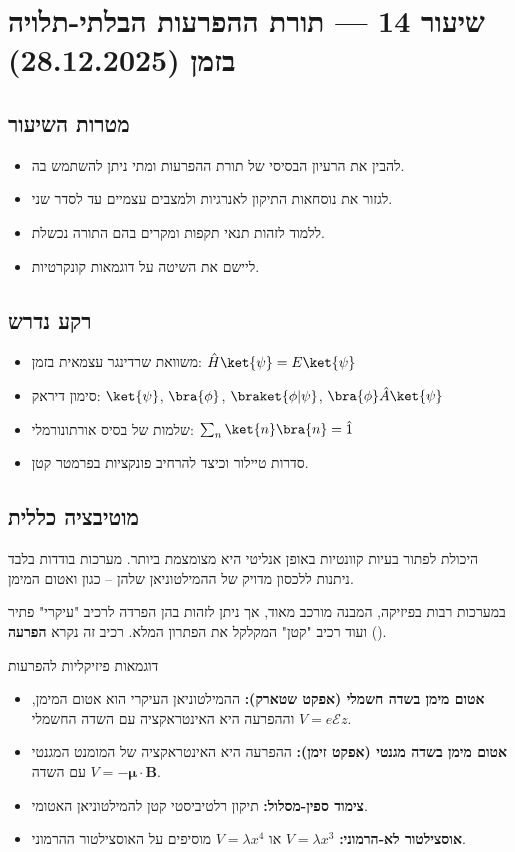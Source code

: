 \section{שיעור 14 — תורת ההפרעות הבלתי-תלויה בזמן (28.12.2025)}

\subsection*{מטרות השיעור}
\begin{itemize}
\item להבין את הרעיון הבסיסי של תורת ההפרעות ומתי ניתן להשתמש בה.
\item לגזור את נוסחאות התיקון לאנרגיות ולמצבים עצמיים עד לסדר שני.
\item ללמוד לזהות תנאי תקפות ומקרים בהם התורה נכשלת.
\item ליישם את השיטה על דוגמאות קונקרטיות.
\end{itemize}

\subsection*{רקע נדרש}
\begin{itemize}
\item משוואת שרדינגר עצמאית בזמן: $\hat{H}\ket{\psi} = E\ket{\psi}$
\item סימון דיראק: $\ket{\psi}$, $\bra{\phi}$, $\braket{\phi|\psi}$, $\bra{\phi}\hat{A}\ket{\psi}$
\item שלמות של בסיס אורתונורמלי: $\sum_n \ket{n}\bra{n} = \hat{1}$
\item סדרות טיילור וכיצד להרחיב פונקציות בפרמטר קטן.
\end{itemize}

\subsection{מוטיבציה כללית}
היכולת לפתור בעיות קוונטיות באופן אנליטי היא מצומצמת ביותר. מערכות בודדות בלבד ניתנות ללכסון מדויק של ההמילטוניאן שלהן – כגון  ואטום המימן.  

במערכות רבות בפיזיקה, המבנה מורכב מאוד, אך ניתן לזהות בהן הפרדה לרכיב "עיקרי" פתיר ועוד רכיב "קטן" המקלקל את הפתרון המלא. רכיב זה נקרא \textbf{הפרעה} ().  

\begin{examplebox}{דוגמאות פיזיקליות להפרעות}
\begin{itemize}
\item \textbf{אטום מימן בשדה חשמלי (אפקט שטארק):} ההמילטוניאן העיקרי הוא אטום המימן, וההפרעה היא האינטראקציה עם השדה החשמלי $V = e\mathcal{E}z$.
\item \textbf{אטום מימן בשדה מגנטי (אפקט זימן):} ההפרעה היא האינטראקציה של המומנט המגנטי עם השדה $V = -\boldsymbol{\mu}\cdot\mathbf{B}$.
\item \textbf{צימוד ספין-מסלול:} תיקון רלטיביסטי קטן להמילטוניאן האטומי.
\item \textbf{אוסצילטור לא-הרמוני:} $V = \lambda x^3$ או $V = \lambda x^4$ מוסיפים על האוסצילטור ההרמוני.
\end{itemize}
\end{examplebox}

